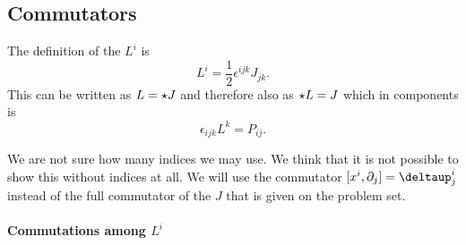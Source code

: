 \documentclass[11pt, english, fleqn, DIV=15, headinclude, BCOR=1cm]{scrartcl}
\begin{document}
\subsection{Commutators}

The definition of the $L^i$ is
\[
    L^i = \frac12 \epsilon^{ijk} J_{jk}.
\]
This can be written as $L = \star J$ and therefore also as $\star L = J$
which in components is
\[
    \epsilon_{ijk} L^k = P_{ij}.
\]

We are not sure how many indices we may use. We think that it is not possible
to show this without indices at all. We will use the commutator $[x^i,
\partial_j] = \deltaup^i_j$ instead of the full commutator of the $J$ that is
given on the problem set.

\paragraph{Commutations among $L^i$}
\end{document}
